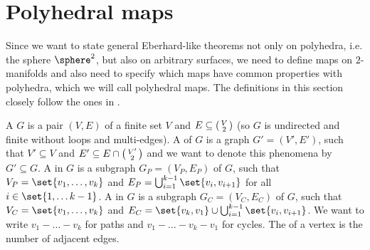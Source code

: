 \section{Polyhedral maps}\label{sec:polymap}

Since we want to state general {\sc Eberhard}-like theorems not only on polyhedra, i.e. the sphere $\sphere^2$, but also on arbitrary surfaces, we need to define maps on $2$-manifolds and also need to specify which maps have common properties with polyhedra, which we will call polyhedral maps. The definitions in this section closely follow the ones in \cite{brehm2004polyhedralmaps}.

\begin{definition}
  A  $G$ is a pair $(V, E)$ of a finite set $V$ and $E \subseteq \begin{psmallmatrix}V\\2\end{psmallmatrix}$ (so $G$ is undirected and finite without loops and multi-edges). A  of $G$ is a graph $G' = (V', E')$, such that $V' \subseteq V$ and $E' \subseteq E \cap  \begin{psmallmatrix}V'\\2\end{psmallmatrix}$ and we want to denote this phenomena by $G' \subseteq G$. A  in $G$ is a subgraph $G_P = (V_P, E_P)$ of $G$, such that $V_P = \set{v_1, \dots, v_k}$ and $E_P = \bigcup_{i = 1}^{k-1}\set{v_i, v_{i+1}}$ for all $i \in \set{1, \dots k - 1}$. A  in $G$ is a subgraph $G_C = (V_C, E_C)$ of $G$, such that $V_C = \set{v_1, \dots, v_k}$ and $E_C = \set{v_k, v_1} \cup \bigcup_{i = 1}^{k-1}\set{v_i, v_{i+1}}$. We want to write $v_1 - \dots - v_k$ for paths and $v_1 - \dots - v_k - v_1$ for cycles. The  of a vertex is the number of adjacent edges.
\end{definition}

